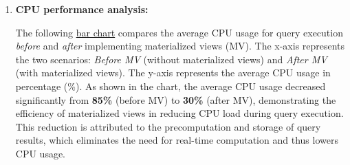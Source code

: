 \begin{enumerate}
\begin{itemize}


\end{itemize} \vspace{.4cm}

    \item \textbf{CPU performance analysis:}

The following \hyperref[fig:cpu_usage]{bar chart} compares the average CPU usage for query execution \textit{before} and \textit{after} implementing materialized views (MV). The x-axis represents the two scenarios: \textit{Before MV} (without materialized views) and \textit{After MV} (with materialized views). The y-axis represents the average CPU usage in percentage (\%). As shown in the chart, the average CPU usage decreased significantly from \textbf{85\%} (before MV) to \textbf{30\%} (after MV), demonstrating the efficiency of materialized views in reducing CPU load during query execution. This reduction is attributed to the precomputation and storage of query results, which eliminates the need for real-time computation and thus lowers CPU usage.

%


\end{enumerate}
